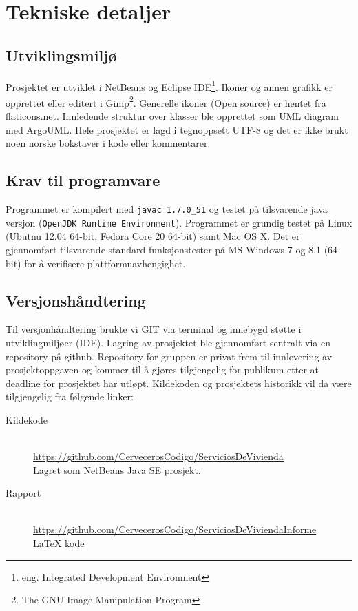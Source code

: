 \section{Tekniske detaljer}

\subsection{Utviklingsmiljø} \label{subssec:utvmiljo}
Prosjektet er utviklet i NetBeans og Eclipse IDE\footnote{eng. Integrated Development Environment}. Ikoner og annen grafikk er opprettet eller editert i Gimp\footnote{The GNU Image Manipulation Program}. Generelle ikoner (Open source) er hentet fra \href{http://www.flaticons.net}{flaticons.net}. Innledende struktur over klasser ble opprettet som UML diagram med ArgoUML.
Hele prosjektet er lagd i tegnoppsett UTF-8 og det er ikke brukt noen norske bokstaver i kode eller kommentarer.

\subsection{Krav til programvare}
Programmet er kompilert med \texttt{javac 1.7.0\_51} og testet på tilsvarende java versjon (\texttt{OpenJDK Runtime Environment}). Programmet er grundig testet på Linux (Ubutnu 12.04 64-bit, Fedora Core 20 64-bit) samt Mac OS X. Det er gjennomført tilsvarende standard funksjonstester på MS Windows 7 og 8.1 (64-bit) for å verifisere plattformuavhengighet. 

\subsection{Versjonshåndtering}
Til versjonhåndtering brukte vi GIT via terminal og innebygd støtte i utviklingmiljøer (IDE). Lagring av prosjektet ble gjennomført sentralt via en repository på github. Repository for gruppen er privat frem til innlevering av prosjektoppgaven og kommer til å gjøres tilgjengelig for publikum etter at deadline for prosjektet har utløpt. Kildekoden og prosjektets historikk vil da være tilgjengelig fra følgende linker:

\begin{description}
\item[Kildekode]
\hfill \\
\url{https://github.com/CervecerosCodigo/ServiciosDeVivienda}
\\Lagret som NetBeans Java SE prosjekt.

\item[Rapport]
\hfill \\
\url{https://github.com/CervecerosCodigo/ServiciosDeViviendaInforme}
\\ \LaTeX{} kode
\end{description}